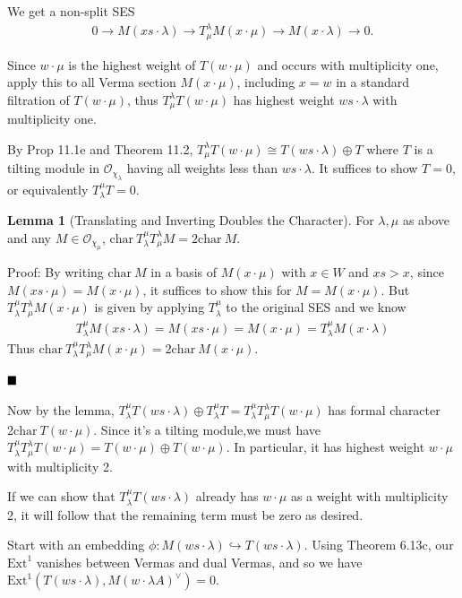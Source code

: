 \documentclass[11pt]{scrartcl}
\theoremstyle{definition}
\theoremstyle{theorem}
\newtheorem{lemma}[theorem]{Lemma}
\theoremstyle{proof}
\theoremstyle{definition}
\theoremstyle{break}
\theoremstyle{problem}
\newcommand{\ch}[0]{\mathrm{char}~}
\newcommand{\ext}[0]{\text{Ext}}
\newcommand{\dual}[0]{^\vee}
\newcommand{\injects}[0]{\hookrightarrow}
\newcommand{\OO}[0]{{\mathcal{O}}}
\renewcommand{\qed}[0]{\hfill\blacksquare}
\renewcommand{\to}[0]{\longrightarrow}
\begin{document}
We get a non-split SES \begin{align*}
0 \to M(xs\cdot \lambda) \to T_\mu^\lambda M(x\cdot \mu) \to M(x\cdot \lambda) \to 0
.\end{align*}

Since \(w\cdot \mu\) is the highest weight of \(T(w\cdot \mu)\) and
occurs with multiplicity one, apply this to all Verma section
\(M(x\cdot \mu)\), including \(x= w\) in a standard filtration of
\(T(w\cdot \mu)\), thus \(T_\mu^\lambda T(w\cdot \mu)\) has highest
weight \(ws\cdot \lambda\) with multiplicity one.

By Prop 11.1e and Theorem 11.2,
\(T_\mu^\lambda T(w\cdot \mu) \cong T(ws \cdot \lambda) \oplus T\) where
\(T\) is a tilting module in \(\OO_{\chi_\lambda}\) having all weights
less than \(ws\cdot \lambda\). It suffices to show \(T=0\), or
equivalently \(T_\lambda^\mu T = 0\).

\begin{lemma}[Translating and Inverting Doubles the Character]

For \(\lambda, \mu\) as above and any \(M\in \OO_{\chi_\mu}\),
\(\ch T_\lambda^\mu T_\mu^\lambda M = 2 \ch M\).\end{lemma}

Proof: By writing \(\ch M\) in a basis of \(M(x\cdot \mu)\) with
\(x\in W\) and \(xs > x\), since \(M(xs \cdot \mu) = M(x \cdot \mu)\),
it suffices to show this for \(M = M(x\cdot \mu)\). But
\(T_\lambda^\mu T_\mu^\lambda M(x\cdot \mu)\) is given by applying
\(T_\lambda^\mu\) to the original SES and we know
\begin{align*}
T_\lambda^\mu M(xs\cdot \lambda) = M(xs \cdot \mu) = M(x\cdot \mu) = T_\lambda^\mu M(x\cdot \lambda)
\end{align*} Thus
\(\ch T_\lambda^\mu T_\mu^\lambda M(x\cdot \mu) = 2\ch M(x\cdot \mu)\).

\(\qed\)

Now by the lemma,
\(T_\lambda^\mu T(ws \cdot \lambda) \oplus T_\lambda^\mu T = T_\lambda^\mu T_\mu^\lambda T(w\cdot \mu)\)
has formal character \(2 \ch T(w\cdot \mu)\). Since it's a tilting
module,we must have
\(T_\lambda^\mu T_\mu^\lambda T(w\cdot \mu) = T(w\cdot \mu) \oplus T(w\cdot \mu)\).
In particular, it has highest weight \(w\cdot \mu\) with multiplicity 2.

If we can show that \(T_\lambda^\mu T(ws\cdot \lambda)\) already has
\(w\cdot \mu\) as a weight with multiplicity 2, it will follow that the
remaining term must be zero as desired.

Start with an embedding
\(\phi: M(ws\cdot \lambda) \injects T(ws\cdot \lambda)\). Using Theorem
6.13c, our \(\ext^1\) vanishes between Vermas and dual Vermas, and so we
have \(\ext^1 (T(ws\cdot \lambda), M(w\cdot\lambda A)\dual) = 0\).
\end{document}
